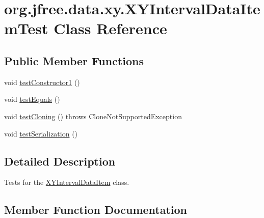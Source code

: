 \hypertarget{classorg_1_1jfree_1_1data_1_1xy_1_1_x_y_interval_data_item_test}{}\section{org.\+jfree.\+data.\+xy.\+X\+Y\+Interval\+Data\+Item\+Test Class Reference}
\label{classorg_1_1jfree_1_1data_1_1xy_1_1_x_y_interval_data_item_test}
\subsection*{Public Member Functions}
\begin{DoxyCompactItemize}
\item 
void \mbox{\hyperlink{classorg_1_1jfree_1_1data_1_1xy_1_1_x_y_interval_data_item_test_a35e459781101296e8f4d80a31e202784}{test\+Constructor1}} ()
\item 
void \mbox{\hyperlink{classorg_1_1jfree_1_1data_1_1xy_1_1_x_y_interval_data_item_test_a3bd2a119a7aebca98d2ec3111c71c69c}{test\+Equals}} ()
\item 
void \mbox{\hyperlink{classorg_1_1jfree_1_1data_1_1xy_1_1_x_y_interval_data_item_test_a7ca50ab9ab588d07684f2f2cf246ff04}{test\+Cloning}} ()  throws Clone\+Not\+Supported\+Exception 
\item 
void \mbox{\hyperlink{classorg_1_1jfree_1_1data_1_1xy_1_1_x_y_interval_data_item_test_a8106b4a3d4130c7aa00e3abdf14c6cd7}{test\+Serialization}} ()
\end{DoxyCompactItemize}


\subsection{Detailed Description}
Tests for the \mbox{\hyperlink{classorg_1_1jfree_1_1data_1_1xy_1_1_x_y_interval_data_item}{X\+Y\+Interval\+Data\+Item}} class. 

\subsection{Member Function Documentation}
\mbox{\label{classorg_1_1jfree_1_1data_1_1xy_1_1_x_y_interval_data_item_test_a7ca50ab9ab588d07684f2f2cf246ff04}} 
